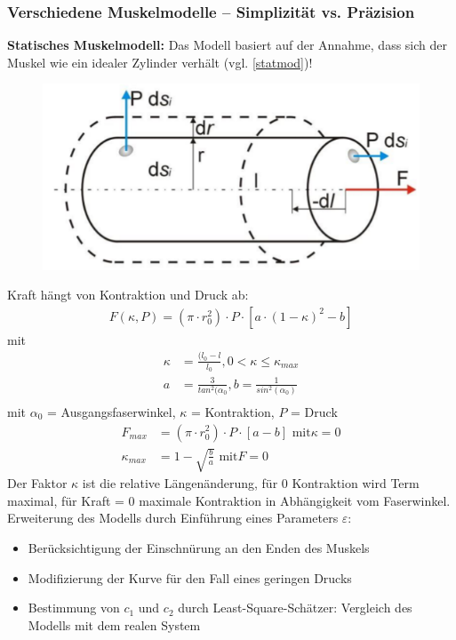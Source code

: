 \subsubsection{Verschiedene Muskelmodelle – Simplizität vs. Präzision}
\textbf{Statisches Muskelmodell:} Das Modell basiert auf der Annahme, dass sich
der Muskel wie ein idealer Zylinder verhält (vgl. \autoref{statmod})!\\
\begin{figure}[h!]
	\centering
	\includegraphics[width=0.5\linewidth]{figures/ch03_stat-modell.png}
	\caption{}
	\label{statmod}
\end{figure}
Kraft hängt von Kontraktion und Druck ab:\\
\begin{align*}
	F(\kappa, P) = (\pi \cdot r_0^2) \cdot P \cdot \left[a \cdot (1 - \kappa)^2 - b\right]
\end{align*}
mit
\begin{align*}
	\kappa &= \frac{(l_0 - l}{l_0}, 0 < \kappa \leq \kappa_{max}\\
	a &= \frac{3}{tan^2(\alpha_0}, b = \frac{1}{sin^2(\alpha_0)}\\
\end{align*} mit $\alpha_0$ = Ausgangsfaserwinkel, $\kappa$ = Kontraktion, $P$ = Druck\\
\begin{align*}
	F_{max} &= (\pi \cdot r_0^2) \cdot P \cdot \left[a - b\right] \text{ mit} \kappa = 0\\
	\kappa_{max} &= 1 - \sqrt{\frac{b}{a}} \text{ mit} F = 0
\end{align*}
Der Faktor $\kappa$ ist die relative Längenänderung, für 0 Kontraktion wird Term maximal, für Kraft = 0 maximale Kontraktion in Abhängigkeit vom Faserwinkel.\\
Erweiterung des Modells durch Einführung eines Parameters $\varepsilon$:
\begin{itemize}
	\item Berücksichtigung der Einschnürung an den Enden des Muskels
	\item Modifizierung der Kurve für den Fall eines geringen Drucks
	\item Bestimmung von $c_1$ und $c_2$ durch Least-Square-Schätzer: Vergleich des Modells mit dem realen System
\end{itemize}
